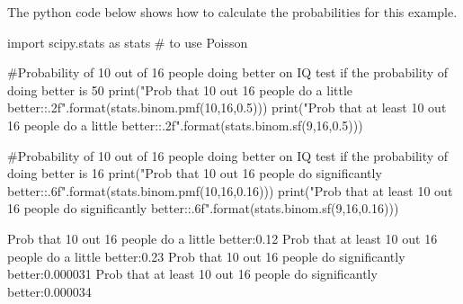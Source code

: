 The python code below shows how to calculate the probabilities for this example.
\begin{python}[caption = Computing binomial probability of null hypothesis] 
import scipy.stats as stats # to use Poisson

#Probability of 10 out of 16 people doing better on IQ test if the probability of doing better is 50%
print("Prob that 10 out 16 people do a little better:{:.2f}".format(stats.binom.pmf(10,16,0.5)))
print("Prob that at least 10 out 16 people do a little better:{:.2f}".format(stats.binom.sf(9,16,0.5)))

#Probability of 10 out of 16 people doing better on IQ test if the probability of doing better is 16%
print("Prob that 10 out 16 people do significantly better:{:.6f}".format(stats.binom.pmf(10,16,0.16)))
print("Prob that at least 10 out 16 people do significantly better:{:.6f}".format(stats.binom.sf(9,16,0.16)))
\end{python}
\begin{poutput}
Prob that 10 out 16 people do a little better:0.12
Prob that at least 10 out 16 people do a little better:0.23
Prob that 10 out 16 people do significantly better:0.000031
Prob that at least 10 out 16 people do significantly better:0.000034
\end{poutput}
\vspace{-0.2cm}
